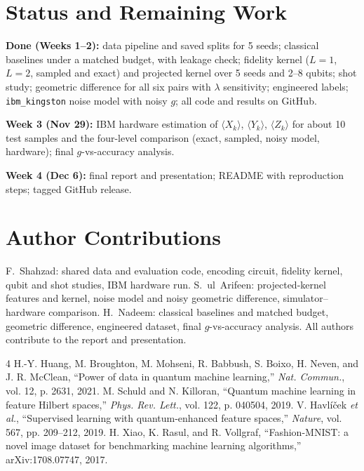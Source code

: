 \documentclass[conference]{IEEEtran}
\begin{document}
\section*{Status and Remaining Work}
\textbf{Done (Weeks 1--2):} data pipeline and saved splits for 5 seeds; classical baselines under a matched budget, with leakage check; fidelity kernel ($L=1$, $L=2$, sampled and exact) and projected kernel over 5 seeds and 2--8 qubits; shot study; geometric difference for all six pairs with $\lambda$ sensitivity; engineered labels; \texttt{ibm\_kingston} noise model with noisy $g$; all code and results on GitHub.

\textbf{Week 3 (Nov 29):} IBM hardware estimation of $\langle X_k\rangle$, $\langle Y_k\rangle$, $\langle Z_k\rangle$ for about 10 test samples and the four-level comparison (exact, sampled, noisy model, hardware); final $g$-vs-accuracy analysis.

\textbf{Week 4 (Dec 6):} final report and presentation; README with reproduction steps; tagged GitHub release.

\section*{Author Contributions}
F.~Shahzad: shared data and evaluation code, encoding circuit, fidelity kernel, qubit and shot studies, IBM hardware run. S.~ul~Arifeen: projected-kernel features and kernel, noise model and noisy geometric difference, simulator--hardware comparison. H.~Nadeem: classical baselines and matched budget, geometric difference, engineered dataset, final $g$-vs-accuracy analysis. All authors contribute to the report and presentation.

\begin{thebibliography}{4}
 H.-Y. Huang, M. Broughton, M. Mohseni, R. Babbush, S. Boixo, H. Neven, and J. R. McClean, ``Power of data in quantum machine learning,'' \textit{Nat. Commun.}, vol. 12, p. 2631, 2021.
 M. Schuld and N. Killoran, ``Quantum machine learning in feature Hilbert spaces,'' \textit{Phys. Rev. Lett.}, vol. 122, p. 040504, 2019.
 V. Havl\'{i}\v{c}ek \textit{et al.}, ``Supervised learning with quantum-enhanced feature spaces,'' \textit{Nature}, vol. 567, pp. 209--212, 2019.
 H. Xiao, K. Rasul, and R. Vollgraf, ``Fashion-MNIST: a novel image dataset for benchmarking machine learning algorithms,'' arXiv:1708.07747, 2017.
\end{thebibliography}
\end{document}
